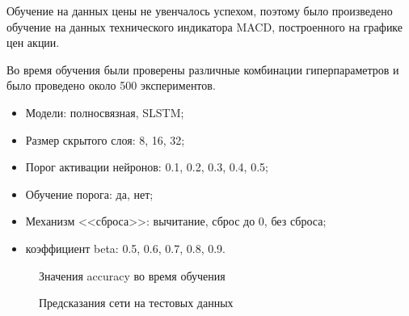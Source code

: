 \documentclass[a4paper,fontsize=12pt,titlepage,final]{scrartcl}
\begin{document}
Обучение на данных цены не увенчалось успехом, поэтому было произведено обучение на данных технического индикатора MACD, построенного на графике цен акции.

Во время обучения были проверены различные комбинации гиперпараметров и было проведено около 500 экспериментов.

\begin{itemize}
    \item Модели: полносвязная, SLSTM;
    \item Размер скрытого слоя: 8, 16, 32;
    \item Порог активации нейронов: 0.1, 0.2, 0.3, 0.4, 0.5;
    \item Обучение порога: да, нет;
    \item Механизм <<сброса>>: вычитание, сброс до 0, без сброса;
    \item коэффициент beta: 0.5, 0.6, 0.7, 0.8, 0.9.
\end{itemize}

\begin{figure}[!h]
\caption{Значения accuracy во время обучения}\label{ris:sinx_trend}
\end{figure}

\begin{figure}[!h]
\caption{Предсказания сети на тестовых данных}\label{ris:sinx_trend}
\end{figure}
\end{document}
